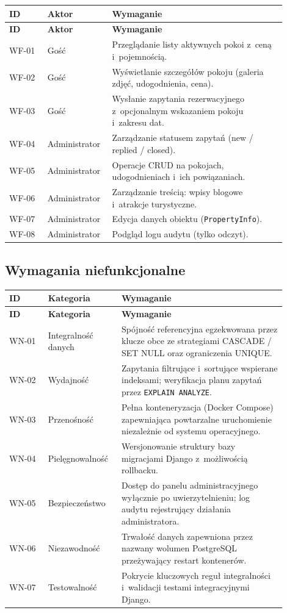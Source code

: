 \documentclass[12pt,a4paper]{article}
\begin{document}
\begin{longtable}{p{0.13\linewidth}p{0.18\linewidth}p{0.59\linewidth}}
\toprule
\textbf{ID} & \textbf{Aktor} & \textbf{Wymaganie} \\
\midrule
\endfirsthead
\toprule
\textbf{ID} & \textbf{Aktor} & \textbf{Wymaganie} \\
\midrule
\endhead
WF-01 & Gość & Przeglądanie listy aktywnych pokoi z~ceną i~pojemnością. \\
WF-02 & Gość & Wyświetlanie szczegółów pokoju (galeria zdjęć, udogodnienia, cena). \\
WF-03 & Gość & Wysłanie zapytania rezerwacyjnego z~opcjonalnym wskazaniem pokoju i~zakresu dat. \\
WF-04 & Administrator & Zarządzanie statusem zapytań (new / replied / closed). \\
WF-05 & Administrator & Operacje CRUD na pokojach, udogodnieniach i~ich powiązaniach. \\
WF-06 & Administrator & Zarządzanie treścią: wpisy blogowe i~atrakcje turystyczne. \\
WF-07 & Administrator & Edycja danych obiektu (\texttt{PropertyInfo}). \\
WF-08 & Administrator & Podgląd logu audytu (tylko odczyt). \\
\bottomrule
\end{longtable}

\subsection{Wymagania niefunkcjonalne}

\begin{longtable}{p{0.13\linewidth}p{0.22\linewidth}p{0.55\linewidth}}
\toprule
\textbf{ID} & \textbf{Kategoria} & \textbf{Wymaganie} \\
\midrule
\endfirsthead
\toprule
\textbf{ID} & \textbf{Kategoria} & \textbf{Wymaganie} \\
\midrule
\endhead
WN-01 & Integralność danych & Spójność referencyjna egzekwowana przez klucze obce ze strategiami CASCADE / SET NULL oraz ograniczenia UNIQUE. \\
WN-02 & Wydajność & Zapytania filtrujące i~sortujące wspierane indeksami; weryfikacja planu zapytań przez \texttt{EXPLAIN ANALYZE}. \\
WN-03 & Przenośność & Pełna konteneryzacja (Docker Compose) zapewniająca powtarzalne uruchomienie niezależnie od systemu operacyjnego. \\
WN-04 & Pielęgnowalność & Wersjonowanie struktury bazy migracjami Django z~możliwością rollbacku. \\
WN-05 & Bezpieczeństwo & Dostęp do panelu administracyjnego wyłącznie po uwierzytelnieniu; log audytu rejestrujący działania administratora. \\
WN-06 & Niezawodność & Trwałość danych zapewniona przez nazwany wolumen PostgreSQL przeżywający restart kontenerów. \\
WN-07 & Testowalność & Pokrycie kluczowych reguł integralności i~walidacji testami integracyjnymi Django. \\
\bottomrule
\end{longtable}
\end{document}

